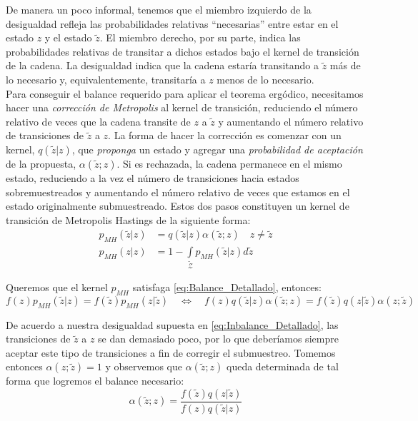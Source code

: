 De manera un poco informal, tenemos que el miembro izquierdo de la desigualdad refleja las probabilidades relativas ``necesarias'' entre estar en el estado $z$ y el estado $\tilde{z}$. El miembro derecho, por su parte, indica las probabilidades relativas de transitar a dichos estados bajo el kernel de transición de la cadena. La desigualdad indica que la cadena estaría transitando a $\tilde{z}$ más de lo necesario y, equivalentemente, transitaría a $z$ menos de lo necesario.\\ 

Para conseguir el balance requerido para aplicar el teorema ergódico, necesitamos hacer una \textit{corrección de Metropolis} al kernel de transición, reduciendo el número relativo de veces que la cadena transite de $z$ a $\tilde{z}$ y aumentando el número relativo de transiciones de $\tilde{z}$ a $z$. La forma de hacer la corrección es comenzar con un kernel, $q(\tilde{z}|z)$, que \textit{proponga} un estado y agregar una \textit{probabilidad de aceptación} de la propuesta, $\alpha(\tilde{z};z)$. Si es rechazada, la cadena permanece en el mismo estado, reduciendo a la vez el número de transiciones hacia estados sobremuestreados y aumentando el número relativo de veces que estamos en el estado originalmente submuestreado. Estos dos pasos constituyen un kernel de transición de Metropolis Hastings de la siguiente forma: 
\begin{align*}
p_{MH}(\tilde{z}|z) &= q(\tilde{z}|z)\alpha(\tilde{z};z) \quad z \neq \tilde{z} \\
p_{MH}(z|z) &= 1 - \int\limits_{\tilde{\mathcal{Z}}} p_{MH}(\tilde{z}|z)d\tilde{z}
\end{align*}

Queremos que el kernel $p_{MH}$ satisfaga \eqref{eq:Balance_Detallado}, entonces:
\begin{equation*}
f(z)p_{MH}(\tilde{z}|z)=f(\tilde{z})p_{MH}(z|\tilde{z}) \quad \Leftrightarrow \quad f(z)q(\tilde{z}|z)\alpha(\tilde{z};z)=f(\tilde{z})q(z|\tilde{z})\alpha(z;\tilde{z}) 
\end{equation*}

De acuerdo a nuestra desigualdad supuesta en \eqref{eq:Inbalance_Detallado}, las transiciones de $\tilde{z}$ a $z$ se dan demasiado poco, por lo que deberíamos siempre aceptar este tipo de transiciones a fin de corregir el submuestreo. Tomemos entonces $\alpha(z;\tilde{z}) = 1$ y observemos que $\alpha(\tilde{z};z)$ queda determinada de tal forma que logremos el balance necesario: 
\begin{equation*}
\alpha(\tilde{z};z)=\dfrac{f(\tilde{z})q(z|\tilde{z})}{f(z)q(\tilde{z}|z)}
\end{equation*}

